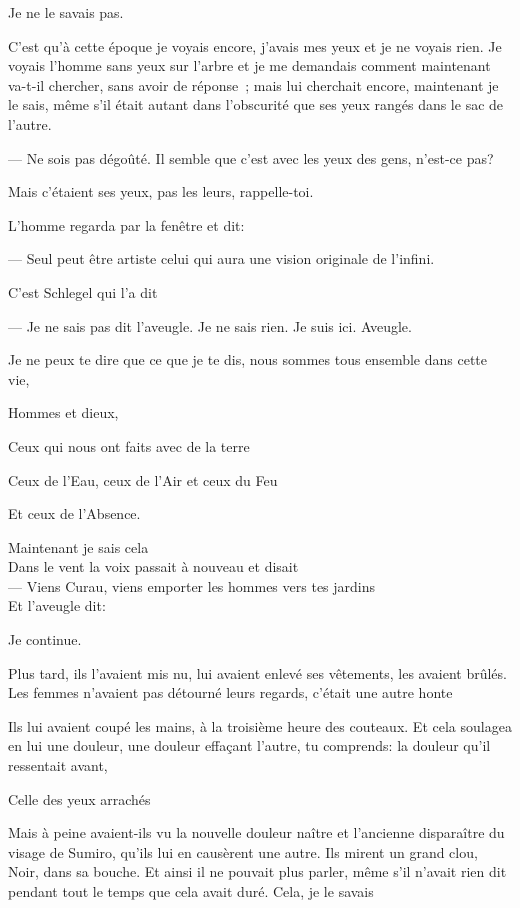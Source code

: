 Je ne le savais pas.

C'est qu'à cette époque je voyais encore, j'avais mes yeux et je ne
voyais rien. Je voyais l'homme sans yeux sur l'arbre et je me demandais
comment maintenant va-t-il chercher, sans avoir de réponse~; mais lui
cherchait encore, maintenant je le sais, même s'il était autant dans
l'obscurité que ses yeux rangés dans le sac de l'autre.

--- Ne sois pas dégoûté. Il semble que c'est avec les yeux des gens,
n'est-ce pas?

Mais c'étaient ses yeux, pas les leurs, rappelle-toi.

L'homme regarda par la fenêtre et dit:

--- Seul peut être artiste celui qui aura une vision originale de
l'infini.

C'est Schlegel qui l'a dit

--- Je ne sais pas dit l'aveugle. Je ne sais rien. Je suis ici. Aveugle.

Je ne peux te dire que ce que je te dis, nous sommes tous ensemble dans
cette vie,

Hommes et dieux,

Ceux qui nous ont faits avec de la terre

Ceux de l'Eau, ceux de l'Air et ceux du Feu

Et ceux de l'Absence.

Maintenant je sais cela\\	

Dans le vent la voix passait à nouveau et disait\\

--- Viens Curau, viens emporter les hommes vers tes jardins\\

Et l'aveugle dit:

Je continue.

Plus tard, ils l'avaient mis nu, lui avaient enlevé ses vêtements, les
avaient brûlés. Les femmes n'avaient pas détourné leurs regards, c'était
une autre honte

Ils lui avaient coupé les mains, à la troisième heure des couteaux. Et
cela soulagea en lui une douleur, une douleur effaçant l'autre, tu
comprends: la douleur qu'il ressentait avant,

Celle des yeux arrachés

Mais à peine avaient-ils vu la nouvelle douleur naître et l'ancienne
disparaître du visage de Sumiro, qu'ils lui en causèrent une autre. Ils
mirent un grand clou, Noir, dans sa bouche. Et ainsi il ne pouvait plus
parler, même s'il n'avait rien dit pendant tout le temps que cela avait
duré. Cela, je le savais\\

